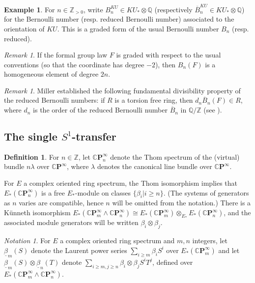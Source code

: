 \documentclass[10pt,a4paper]{amsart}
\theoremstyle{definition}
\newtheorem{defn}[thm]{Definition}
\newtheorem{exam}[thm]{Example}
\theoremstyle{remark}
\newtheorem{rem}[thm]{Remark}
\newtheorem{nota}[thm]{Notation}
\newcommand{\qz}{{\rat/\zed}}
\newcommand{\zedpos}{\zed_{>0}}
\newcommand{\divBern}{\overline{B}}
\newcommand{\zed}{\mathbb{Z}}
\newcommand{\rat}{\mathbb{Q}}
\newcommand{\cp}{\mathbb{C} \mathbf{P}^\infty}
\renewcommand{\smash}{\wedge}
\begin{document}
\begin{exam}
 For $n \in \zedpos$, write  $B_n^{KU} \in KU_* \otimes \rat$  (respectively
$\divBern_n ^{KU} \in KU_* \otimes \rat$)  for the  Bernoulli number (resp. reduced  Bernoulli number)  associated to the
orientation of  $KU$. This is a graded form of the usual  Bernoulli number $B_n$ (resp. reduced).
\end{exam}

\begin{rem}
	If the formal group law $F$ is graded with respect to the usual conventions (so that the coordinate has degree $-2$), then $B_n (F)$ is a homogeneous element of degree $2n$.
\end{rem}

\begin{rem}
	Miller  established the following fundamental divisibility property of the reduced Bernoulli numbers: if $R$ is a torsion free ring, then $d_n \divBern_n (F)  \in R$, where $d_n$ is the order of the reduced Bernoulli number $\divBern_n $ in $\qz$ (see \cite[Theorem 1.3]{miller}).
\end{rem}



\subsection{The single $S^1$-transfer}

\begin{defn}
For $n \in \zed$, let $\cp_n$ denote the Thom spectrum of the
(virtual) bundle $n \lambda$ over $\cp$, where $\lambda$ denotes the canonical
line bundle over $\cp$.
\end{defn}

For $E$  a complex oriented ring spectrum,  the Thom isomorphism implies that  $E_* (\cp_n)$ is a free $E_*$-module on
classes $\{\beta_i | i \geq n \}$.  (The systems of generators as $n$ varies are compatible, hence $n$ will be omitted from the notation.)
 There is a  Künneth  isomorphism $E_* (\cp_m \smash \cp _n) \cong E_* (\cp_m) \otimes _{E_*} E_* (\cp_n)$, and the associated module generators will be written $\beta_i \otimes \beta_j$.

\begin{nota}
	For $E$  a complex oriented ring spectrum and $m,n$  integers, let $\underline{\beta}_m (S)$ denote the
Laurent power series $\sum_{i \geq m} \beta_i S ^i$ over  $E_* (\cp_m)$ and let $\underline{\beta}_m (S) \otimes  \underline{\beta}_n (T)$ denote $\sum_{i \geq m, j  \geq n} \beta_i \otimes \beta_j S ^iT^j$, defined over $E_* (\cp_m \smash \cp_n)$.
\end{nota}
\end{document}
